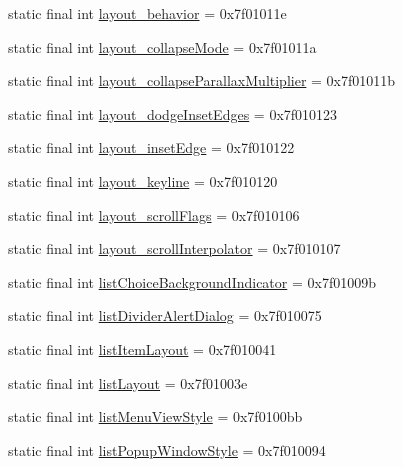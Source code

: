 \begin{CompactItemize}
\item 
static final int \hyperlink{classandroid_1_1support_1_1v4_1_1_r_1_1attr_a9aef85beb8bc006fb87ab1f9eb178f3}{layout\_\-behavior} = 0x7f01011e
\item 
static final int \hyperlink{classandroid_1_1support_1_1v4_1_1_r_1_1attr_d72f2c23e1ab82ddcae4fa409421133b}{layout\_\-collapseMode} = 0x7f01011a
\item 
static final int \hyperlink{classandroid_1_1support_1_1v4_1_1_r_1_1attr_25f8f69dee033158e6eb7aef783577a5}{layout\_\-collapseParallaxMultiplier} = 0x7f01011b
\item 
static final int \hyperlink{classandroid_1_1support_1_1v4_1_1_r_1_1attr_3ef512fff627f839d4147629442721f0}{layout\_\-dodgeInsetEdges} = 0x7f010123
\item 
static final int \hyperlink{classandroid_1_1support_1_1v4_1_1_r_1_1attr_be6ab2265ae501530a1d0c3e4d129530}{layout\_\-insetEdge} = 0x7f010122
\item 
static final int \hyperlink{classandroid_1_1support_1_1v4_1_1_r_1_1attr_e8b923df794a4d3214ef359ea296276c}{layout\_\-keyline} = 0x7f010120
\item 
static final int \hyperlink{classandroid_1_1support_1_1v4_1_1_r_1_1attr_372a6fac3cf685458fc5b5390db5d2c2}{layout\_\-scrollFlags} = 0x7f010106
\item 
static final int \hyperlink{classandroid_1_1support_1_1v4_1_1_r_1_1attr_a4c2d8864dc05978cf783570c112b608}{layout\_\-scrollInterpolator} = 0x7f010107
\item 
static final int \hyperlink{classandroid_1_1support_1_1v4_1_1_r_1_1attr_54309dc033c5bb775be6982449c69c5a}{listChoiceBackgroundIndicator} = 0x7f01009b
\item 
static final int \hyperlink{classandroid_1_1support_1_1v4_1_1_r_1_1attr_7ad1723d1c14fd74cd90b447f3513b5c}{listDividerAlertDialog} = 0x7f010075
\item 
static final int \hyperlink{classandroid_1_1support_1_1v4_1_1_r_1_1attr_c733be5fa576e724d924100ec23a326a}{listItemLayout} = 0x7f010041
\item 
static final int \hyperlink{classandroid_1_1support_1_1v4_1_1_r_1_1attr_986764bbce8329b87353bcfe79effe4e}{listLayout} = 0x7f01003e
\item 
static final int \hyperlink{classandroid_1_1support_1_1v4_1_1_r_1_1attr_b78351e81e4af1575c15d5904be051cd}{listMenuViewStyle} = 0x7f0100bb
\item 
static final int \hyperlink{classandroid_1_1support_1_1v4_1_1_r_1_1attr_926afd0ad0e20a7fcb923f50fc7e0ddd}{listPopupWindowStyle} = 0x7f010094

\end{CompactItemize}
